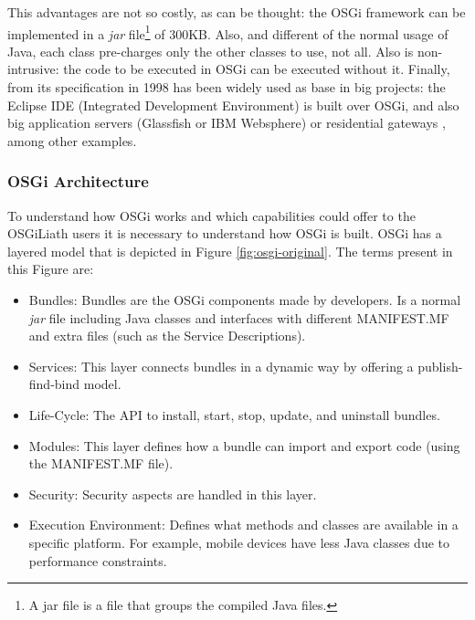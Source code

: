 This advantages are not so
                               costly, as can be thought: the OSGi
                                framework can be implemented in a
                                {\em jar} file\footnote{A jar file is
                                a file that groups the compiled Java
                                files.} of 300KB. Also, and different
                                of the normal usage of Java, each
                                class pre-charges only the other
                                classes to use, not all. Also is
                                non-intrusive: the code to be
                                executed in OSGi can be executed
                                without it. Finally, from its
                                specification in 1998 has been widely
                                used as base in big projects: the
                                Eclipse IDE (Integrated Development
                                Environment) is built over OSGi, and
                                also big application servers
                               (Glassfish or IBM Websphere) or
                               residential gateways
                               \cite{GarciaSanchez2013Gateway}, among other
                               examples. 

\subsubsection{OSGi Architecture}
To understand how OSGi \cite{Moussa2010Composition} works and which capabilities could offer to the OSGiLiath users it is necessary to understand how OSGi is built. OSGi has a layered model that is depicted in Figure \ref{fig:osgi-original}. The terms present in this Figure are:

\begin{itemize}
\item Bundles: Bundles are the OSGi components made by developers. Is a normal {\em jar} file including Java classes and interfaces with different MANIFEST.MF and extra files (such as the Service Descriptions).
\item Services: This layer connects bundles in a dynamic way by offering a publish-find-bind model.
\item Life-Cycle: The API to install, start, stop, update, and uninstall bundles.
\item Modules: This layer defines how a bundle can import and export code (using the MANIFEST.MF file).
\item Security: Security aspects are handled in this layer.
\item Execution Environment: Defines what methods and classes are available in a specific platform. For example, mobile devices have less Java classes due to performance constraints.
\end{itemize}

